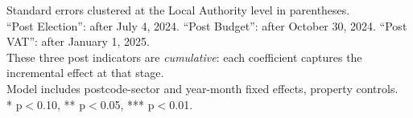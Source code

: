 \begin{table}[htbp]
   \par \raggedright 
   Standard errors clustered at the Local Authority level in parentheses.\\
   ``Post Election'': after July 4, 2024. ``Post Budget'': after October 30, 2024. ``Post VAT'': after January 1, 2025.\\
   These three post indicators are \textit{cumulative}: each coefficient captures the incremental effect at that stage.\\
   Model includes postcode-sector and year-month fixed effects, property controls.\\
   * p$<$0.10, ** p$<$0.05, *** p$<$0.01.
\end{table}


